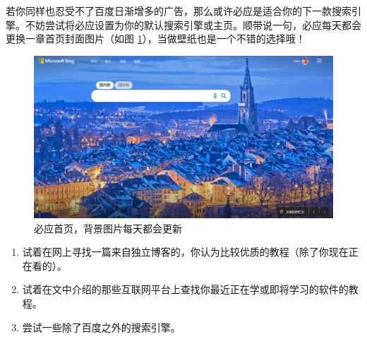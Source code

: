 若你同样也忍受不了百度日渐增多的广告，那么或许必应是适合你的下一款搜索引擎。不妨尝试将必应设置为你的默认搜索引擎或主页。顺带说一句，必应每天都会更换一章首页封面图片（如图 \ref{Bing_2}），当做壁纸也是一个不错的选择哦！

\begin{figure}[htb!]
  \centering
  \includegraphics[width=12cm]{assets/Bing_2.png}
  \caption{必应首页，背景图片每天都会更新}
  \label{Bing_2}
\end{figure}

\practice

\begin{enumerate}
  \item 试着在网上寻找一篇来自独立博客的，你认为比较优质的教程（除了你现在正在看的）。
  \item 试着在文中介绍的那些互联网平台上查找你最近正在学或即将学习的软件的教程。
  \item 尝试一些除了百度之外的搜索引擎。
\end{enumerate}
